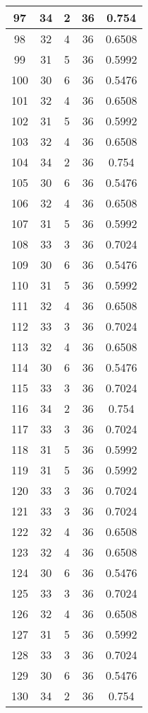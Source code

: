 \documentclass[letterpaper, 12pt]{article}
\begin{document}
\begin{longtable}{|c|c|c|c|c|}
\hline
97 & 34 & 2 & 36 & 0.754 \\
\hline
98 & 32 & 4 & 36 & 0.6508 \\
\hline
99 & 31 & 5 & 36 & 0.5992 \\
\hline
100 & 30 & 6 & 36 & 0.5476 \\
\hline
101 & 32 & 4 & 36 & 0.6508 \\
\hline
102 & 31 & 5 & 36 & 0.5992 \\
\hline
103 & 32 & 4 & 36 & 0.6508 \\
\hline
104 & 34 & 2 & 36 & 0.754 \\
\hline
105 & 30 & 6 & 36 & 0.5476 \\
\hline
106 & 32 & 4 & 36 & 0.6508 \\
\hline
107 & 31 & 5 & 36 & 0.5992 \\
\hline
108 & 33 & 3 & 36 & 0.7024 \\
\hline
109 & 30 & 6 & 36 & 0.5476 \\
\hline
110 & 31 & 5 & 36 & 0.5992 \\
\hline
111 & 32 & 4 & 36 & 0.6508 \\
\hline
112 & 33 & 3 & 36 & 0.7024 \\
\hline
113 & 32 & 4 & 36 & 0.6508 \\
\hline
114 & 30 & 6 & 36 & 0.5476 \\
\hline
115 & 33 & 3 & 36 & 0.7024 \\
\hline
116 & 34 & 2 & 36 & 0.754 \\
\hline
117 & 33 & 3 & 36 & 0.7024 \\
\hline
118 & 31 & 5 & 36 & 0.5992 \\
\hline
119 & 31 & 5 & 36 & 0.5992 \\
\hline
120 & 33 & 3 & 36 & 0.7024 \\
\hline
121 & 33 & 3 & 36 & 0.7024 \\
\hline
122 & 32 & 4 & 36 & 0.6508 \\
\hline
123 & 32 & 4 & 36 & 0.6508 \\
\hline
124 & 30 & 6 & 36 & 0.5476 \\
\hline
125 & 33 & 3 & 36 & 0.7024 \\
\hline
126 & 32 & 4 & 36 & 0.6508 \\
\hline
127 & 31 & 5 & 36 & 0.5992 \\
\hline
128 & 33 & 3 & 36 & 0.7024 \\
\hline
129 & 30 & 6 & 36 & 0.5476 \\
\hline
130 & 34 & 2 & 36 & 0.754 \\

\end{longtable}
\end{document}
